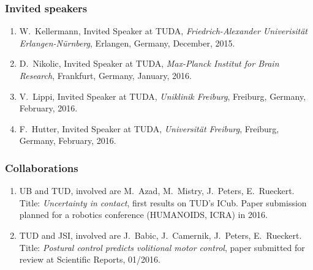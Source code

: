 

\subsubsection{Invited speakers}%
\begin{enumerate}
	\item W.~Kellermann, Invited Speaker at TUDA, \emph{Friedrich-Alexander Univerisit\"at Erlangen-N\"urnberg}, Erlangen, Germany, December, 2015.
	\item D.~Nikolic, Invited Speaker at TUDA, \emph{Max-Planck Institut for Brain Research}, Frankfurt, Germany, January, 2016.
	\item V.~Lippi, Invited Speaker at TUDA, \emph{Uniklinik Freiburg}, Freiburg, Germany, February, 2016.
	\item F.~Hutter, Invited Speaker at TUDA, \emph{Universit\"at Freiburg}, Freiburg, Germany, February, 2016.
\end{enumerate}

\subsubsection{Collaborations}

\begin{enumerate}%
	\item UB and TUD, involved are M.~Azad, M.~Mistry, J.~Peters, E.~Rueckert. Title: \emph{Uncertainty in contact}, first results on TUD's ICub. Paper submission planned for a robotics conference (HUMANOIDS, ICRA) in 2016. 
	\item TUD and JSI, involved are J.~Babic, J.~Camernik, J.~Peters, E.~Rueckert. Title: \emph{Postural control predicts volitional motor control}, paper submitted for review at Scientific Reports, 01/2016.
\end{enumerate}

